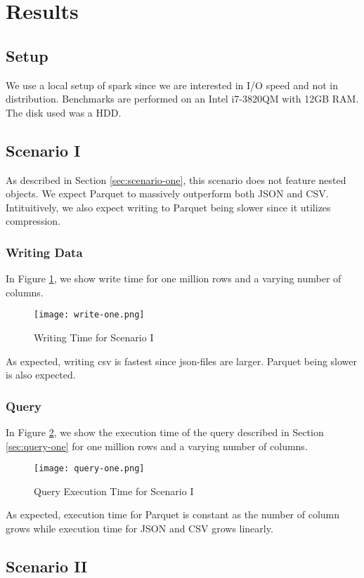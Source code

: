 \section{Results} \label{sec:results}


\subsection{Setup}
We use a local setup of spark since we are interested in I/O speed and not in distribution.
Benchmarks are performed on an Intel i7-3820QM with 12GB RAM. The disk used was a HDD.

\subsection{Scenario I}
As described in Section \ref{sec:scenario-one}, this scenario does not feature nested objects.
We expect Parquet to massively outperform both JSON and CSV.
Intituitively, we also expect writing to Parquet being slower since it utilizes compression.

\subsubsection{Writing Data}
In Figure \ref{fig:write-one}, we show write time for one million rows and a varying number of columns.

\begin{figure}[h]
\caption{Writing Time for Scenario I}
\centering
\texttt{[image: write-one.png]}
\label{fig:write-one}
\end{figure}

As expected, writing csv is fastest since json-files are larger. Parquet being slower is also expected.

\subsubsection{Query}
In Figure \ref{fig:query-one}, we show the execution time of the query described in Section \ref{sec:query-one} for one million rows and a varying number of columns.

\begin{figure}[h]
\caption{Query Execution Time for Scenario I}
\centering
\texttt{[image: query-one.png]}
\label{fig:query-one}
\end{figure}

As expected, execution time for Parquet is constant as the number of column grows while execution time for JSON and CSV grows linearly.

\subsection{Scenario II}

